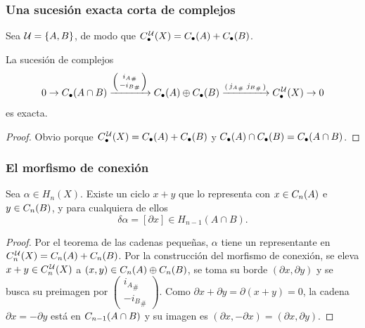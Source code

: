 \begin{frame}[allowframebreaks]
  \frametitle{Una sucesión exacta corta de complejos}

  Sea $\mathcal{U}=\{A,B\}$, de modo que
  $C^{\mkern2mu\mathcal{U}}_\bullet(X)=C_\bullet(A)+C_\bullet(B)$.

  \begin{lemma}
    La sucesión de complejos
    \[
      0\to C_\bullet(A\cap B)\xrightarrow{\left(\begin{smallmatrix}{i_A}_\#\\-{i_B}_\#\end{smallmatrix}\right)}
      C_\bullet(A)\oplus C_\bullet(B)\xrightarrow{\left(\begin{smallmatrix}{j_A}_\# & {j_B}_\#\end{smallmatrix}\right)}
      C^{\mkern2mu\mathcal{U}}_\bullet(X)\to0
    \]
    es exacta.
  \end{lemma}

  \begin{proof}
    Obvio porque $C^{\mkern2mu\mathcal{U}}_\bullet(X)=C_\bullet(A)+C_\bullet(B)$ y $C_\bullet(A)\cap C_\bullet(B)=C_\bullet(A\cap B)$.
  \end{proof}
\end{frame}

\begin{frame}
  \frametitle{El morfismo de conexión}

  \begin{proposition}
    Sea $\alpha\in H_n(X)$. Existe un ciclo $x+y$ que lo representa con
    $x\in C_n(A)$ e $y\in C_n(B)$, y para cualquiera de ellos
    \[
      \delta\alpha=[\partial x]\in H_{n-1}(A\cap B).
    \]
  \end{proposition}

  \begin{proof}
    Por el teorema de las cadenas pequeñas, $\alpha$ tiene un representante
    en $C^{\mkern2mu\mathcal{U}}_n(X)=C_n(A)+C_n(B)$. Por la construcción del morfismo de
    conexión, se eleva $x+y\in C^{\mkern2mu\mathcal{U}}_n(X)$ a $(x,y)\in C_n(A)\oplus C_n(B)$, se toma su borde $(\partial
    x,\partial y)$ y se busca su preimagen por $\left(\begin{smallmatrix}{i_A}_\#\\-{i_B}_\#\end{smallmatrix}\right)$. Como
    $\partial x+\partial y=\partial(x+y)=0$, la cadena
    $\partial x=-\partial y$ está en $C_{n-1}(A\cap B)$ y su imagen es
    $(\partial x,-\partial x)=(\partial x,\partial y)$.
  \end{proof}
\end{frame}

